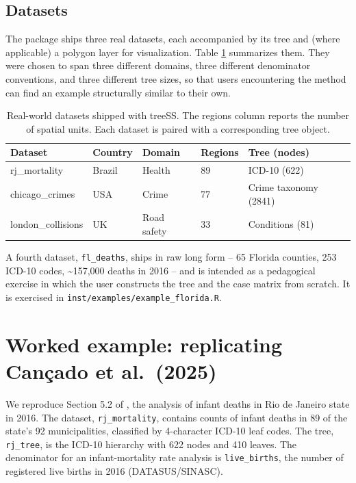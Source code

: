 \hypertarget{datasets}{%
\subsection{Datasets}\label{datasets}}

The package ships three real datasets, each accompanied by its tree and
(where applicable) a polygon layer for visualization. Table
\ref{tab:datasets} summarizes them. They were chosen to span three
different domains, three different denominator conventions, and three
different tree sizes, so that users encountering the method can find an
example structurally similar to their own.

\begin{table}

\caption{\label{tab:datasets}Real-world datasets shipped with treeSS. The regions column reports the number of spatial units. Each dataset is paired with a corresponding tree object.}
\centering
\begin{tabular}[t]{lllll}
\toprule
Dataset & Country & Domain & Regions & Tree (nodes)\\
\midrule
rj\_mortality & Brazil & Health & 89 & ICD-10 (622)\\
chicago\_crimes & USA & Crime & 77 & Crime taxonomy (2841)\\
london\_collisions & UK & Road safety & 33 & Conditions (81)\\
\bottomrule
\end{tabular}
\end{table}

A fourth dataset, \texttt{fl\_deaths}, ships in raw long form -- 65 Florida
counties, 253 ICD-10 codes, \textasciitilde157,000 deaths in 2016 -- and is intended as
a pedagogical exercise in which the user constructs the tree and the
case matrix from scratch. It is exercised in
\texttt{inst/examples/example\_florida.R}.

\hypertarget{sec-example}{%
\section{Worked example: replicating Cançado et al.~(2025)}\label{sec-example}}

We reproduce Section 5.2 of \citet{cancado2025}, the analysis of infant deaths in
Rio de Janeiro state in 2016. The dataset, \texttt{rj\_mortality}, contains
counts of infant deaths in 89 of the state's 92 municipalities, classified
by 4-character ICD-10 leaf codes. The tree, \texttt{rj\_tree}, is the ICD-10
hierarchy with 622 nodes and 410 leaves. The denominator for an
infant-mortality rate analysis is \texttt{live\_births}, the number of registered
live births in 2016 (DATASUS/SINASC).

